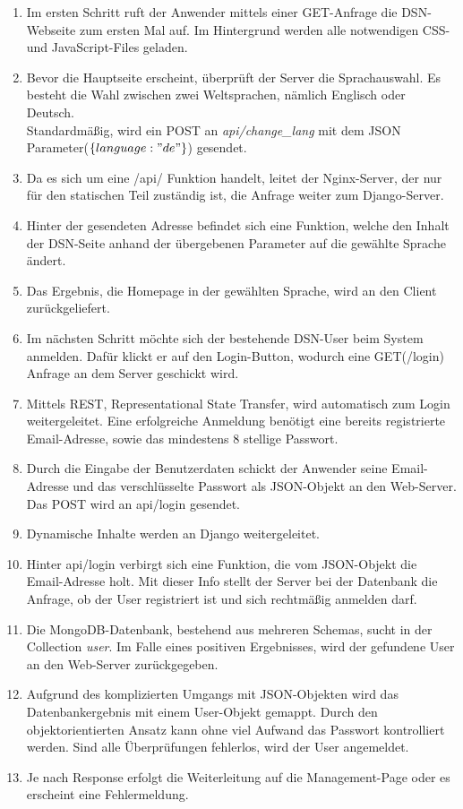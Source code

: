 \begin{enumerate}
\item Im ersten Schritt ruft der Anwender mittels einer GET-Anfrage die DSN-Webseite zum ersten Mal auf. Im Hintergrund werden alle notwendigen CSS- und JavaScript-Files geladen.
\item Bevor die Hauptseite erscheint, überprüft der Server die Sprachauswahl. Es besteht die Wahl zwischen zwei Weltsprachen, nämlich Englisch oder Deutsch.\\
Standardmäßig, wird ein POST an \textit{api/change\_lang} mit dem JSON Parameter($\{language:"de"\}$) gesendet.
\item Da es sich um eine /api/ Funktion handelt, leitet der Nginx-Server, der nur für den statischen Teil zuständig ist, die Anfrage weiter zum Django-Server.
\item Hinter der gesendeten Adresse befindet sich eine Funktion, welche den Inhalt der DSN-Seite anhand der übergebenen Parameter auf die gewählte Sprache ändert.
\item Das Ergebnis, die Homepage in der gewählten Sprache, wird an den Client zurückgeliefert.
\item Im nächsten Schritt möchte sich der bestehende DSN-User beim System anmelden. Dafür klickt er auf den Login-Button, wodurch eine GET(/login) Anfrage an dem Server geschickt wird.
\item Mittels \gls{REST}, Representational State Transfer, wird automatisch zum Login weitergeleitet. Eine erfolgreiche Anmeldung benötigt eine bereits registrierte Email-Adresse, sowie das mindestens 8 stellige Passwort.
\item Durch die Eingabe der Benutzerdaten schickt der Anwender seine Email-Adresse und das verschlüsselte Passwort als JSON-Objekt an den Web-Server. Das POST wird an api/login gesendet.
\item Dynamische Inhalte werden an Django weitergeleitet.
\item Hinter api/login verbirgt sich eine Funktion, die vom JSON-Objekt die Email-Adresse holt. Mit dieser Info stellt der Server bei der Datenbank die Anfrage, ob der User registriert ist und sich rechtmäßig anmelden darf.
\item Die MongoDB-Datenbank, bestehend aus mehreren Schemas, sucht in der Collection \textit{user}. Im Falle eines positiven Ergebnisses, wird der gefundene User an den Web-Server zurückgegeben.
\item Aufgrund des komplizierten Umgangs mit JSON-Objekten wird das Datenbankergebnis mit einem User-Objekt gemappt. Durch den objektorientierten Ansatz kann ohne viel Aufwand das Passwort kontrolliert werden. Sind alle Überprüfungen fehlerlos, wird der User angemeldet.
\item Je nach Response erfolgt die Weiterleitung auf die Management-Page oder es erscheint eine Fehlermeldung.
\end{enumerate}


